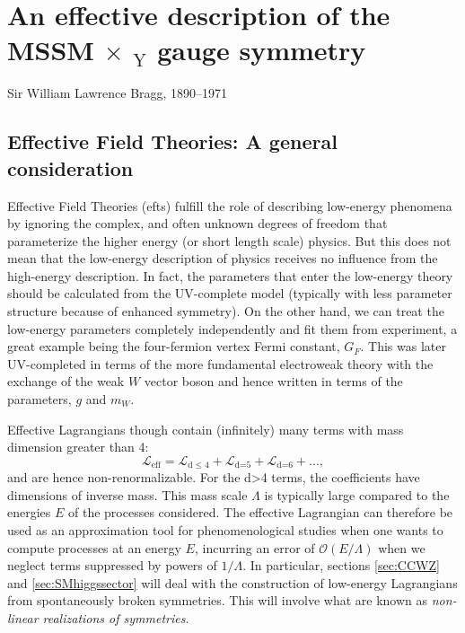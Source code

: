 \chapter{An effective description of the MSSM  $\times$ $_\text{Y}$ gauge symmetry}
\label{chap:nonlinearhiggs}

%
{Sir William Lawrence Bragg, 1890--1971}

\section{Effective Field Theories: A general consideration}
\label{sec:EFT}

Effective Field Theories (\acrshort{eft}s) fulfill the role of describing low-energy phenomena by ignoring the complex, and often unknown degrees of freedom that parameterize the higher energy (or short length scale) physics. But this does not mean that the low-energy description of physics receives no influence from the high-energy description. In fact, the parameters that enter the low-energy theory should be calculated from the UV-complete model (typically with less parameter structure because of enhanced symmetry). On the other hand, we can treat the low-energy parameters completely independently and fit them from experiment, a great example being the four-fermion vertex Fermi constant, $G_F$. This was later UV-completed in terms of the more fundamental electroweak theory with the exchange of the weak $W$ vector boson and hence written in terms of the parameters, $g$ and $m_W$.

Effective Lagrangians though contain (infinitely) many terms with mass dimension greater than 4:
\begin{equation}
\mathcal{L}_{\text{eff}}=\mathcal{L}_{\text{d} \leq 4}+\mathcal{L}_{\text{d=5}}+\mathcal{L}_{\text{d=6}}+...,
\end{equation}
and are hence non-renormalizable. For the d>4 terms, the coefficients have dimensions of inverse mass. This mass scale $\Lambda$ is typically large compared to the energies $E$ of the processes considered. The effective Lagrangian can therefore be used as an approximation tool for phenomenological studies when one wants to compute processes at an energy $E$, incurring an error of $\mathcal{O}(E/\Lambda)$ when we neglect terms suppressed by powers of $1/\Lambda$. In particular, sections \ref{sec:CCWZ} and \ref{sec:SMhiggssector} will deal with the construction of low-energy Lagrangians from spontaneously broken symmetries. This will involve what are known as \textit{non-linear realizations of symmetries}.

